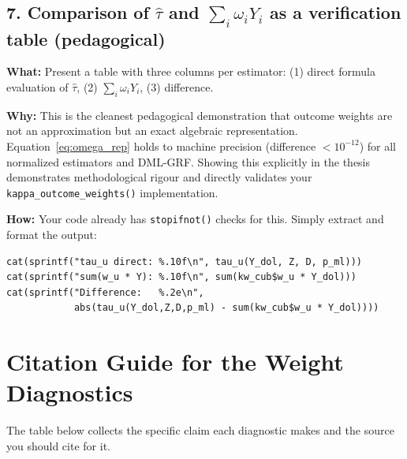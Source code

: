 \documentclass[12pt, a4paper]{article}
\begin{document}
\subsection*{7. Comparison of $\hat{\tau}$ and $\sum_i \omega_i Y_i$ as a
  verification table (pedagogical)}

\textbf{What:} Present a table with three columns per estimator:
(1) direct formula evaluation of $\hat{\tau}$, (2) $\sum_i \omega_i Y_i$,
(3) difference.

\textbf{Why:} This is the cleanest pedagogical demonstration that outcome
weights are not an approximation but an exact algebraic representation.
Equation~\eqref{eq:omega_rep} holds to machine precision (difference $<
10^{-12}$) for all normalized estimators and DML-GRF. Showing this explicitly
in the thesis demonstrates methodological rigour and directly validates your
\texttt{kappa\_outcome\_weights()} implementation.

\textbf{How:} Your code already has \texttt{stopifnot()} checks for this.
Simply extract and format the output:
\begin{verbatim}
cat(sprintf("tau_u direct: %.10f\n", tau_u(Y_dol, Z, D, p_ml)))
cat(sprintf("sum(w_u * Y): %.10f\n", sum(kw_cub$w_u * Y_dol)))
cat(sprintf("Difference:   %.2e\n",
            abs(tau_u(Y_dol,Z,D,p_ml) - sum(kw_cub$w_u * Y_dol))))
\end{verbatim}

\section*{Citation Guide for the Weight Diagnostics}

The table below collects the specific claim each diagnostic makes and the
source you should cite for it.
\end{document}
